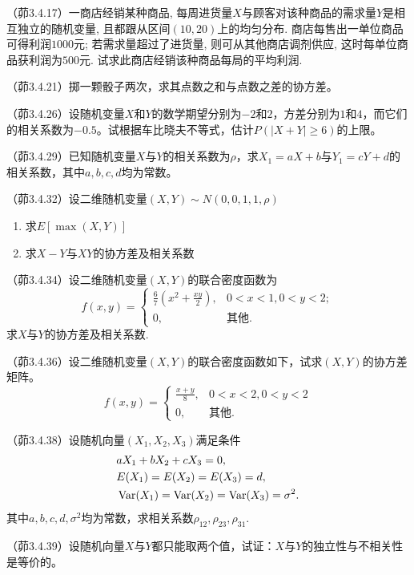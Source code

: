 \begin{problemset}[错题记录]
    \item （茆3.4.17）一商店经销某种商品, 每周进货量$X$与顾客对该种商品的需求量$Y$是相互独立的随机变量, 且都跟从区间$(10,20)$上的均匀分布. 商店每售出一单位商品可得利润$1000$元; 若需求量超过了进货量, 则可从其他商店调剂供应, 这时每单位商品获利润为$500$元. 试求此商店经销该种商品每局的平均利润.
    \item （茆3.4.21）掷一颗骰子两次，求其点数之和与点数之差的协方差。
    \item （茆3.4.26）设随机变量$X$和$Y$的数学期望分别为$-2$和$2$，方差分别为$1$和$4$，而它们的相关系数为$-0.5$。试根据车比晓夫不等式，估计$P(|X+Y|\ge 6)$的上限。
    \item （茆3.4.29）已知随机变量$X$与$Y$的相关系数为$\rho$，求$X_1=aX+b$与$Y_1=cY+d$的相关系数，其中$a,b,c,d$均为常数。
    \item （茆3.4.32）设二维随机变量$(X,Y) \sim N(0,0,1,1,\rho)$
    \begin{enumerate}
        \item 求$E[\max(X,Y)]$
        \item 求$X-Y$与$XY$的协方差及相关系数
    \end{enumerate}
    \item （茆3.4.34）设二维随机变量$(X,Y)$的联合密度函数为
    \[ f(x,y)=\begin{cases}
            \frac{6}{7}\left(x^2+\frac{xy}{2} \right), & 0<x<1,0<y<2; \\
            0,                                         & \text{其他}.
        \end{cases} \]
    求$X$与$Y$的协方差及相关系数.
    \item （茆3.4.36）设二维随机变量$(X,Y)$的联合密度函数如下，试求$(X,Y)$的协方差矩阵。
    \[ f(x,y)=\begin{cases}
            \frac{x+y}{8}, & 0<x<2,0<y<2  \\
            0,             & \text{其他}.
        \end{cases} \]
    \item （茆3.4.38）设随机向量$(X_1,X_2,X_3)$满足条件
    \begin{align*}
         & aX_1+bX_2+cX_3=0,                       \\
         & E(X_1)=E(X_2)=E(X_3)=d,                 \\
         & \operatorname{Var}(X_1)=\operatorname{Var}(X_2)=\operatorname{Var}(X_3)=\sigma^2.
    \end{align*}
    其中$a, b, c, d, \sigma^{2}$均为常数，求相关系数$\rho_{12},\rho_{23},\rho_{31}$.
    \item （茆3.4.39）设随机向量$X$与$Y$都只能取两个值，试证：$X$与$Y$的独立性与不相关性是等价的。

\end{problemset}
